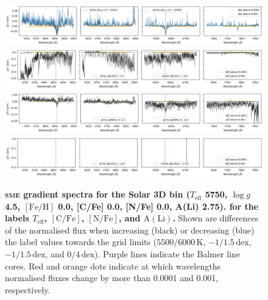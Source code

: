 \documentclass[
  journal=pasa,
  manuscript=research-paper, %
  year=2023,
  volume=37
]{cup-journal}
\newcommand{\Teff}{$T_\mathrm{eff}$\xspace}
\newcommand{\logg}{$\log g$\xspace}
\newcommand{\feh}{$\mathrm{[Fe/H]}$\xspace}
\newcommand{\vmic}{$v_\mathrm{mic}$\xspace}
\newcommand{\sme}{\textsc{sme}\xspace}
\newcommand{\dex}{\,\mathrm{dex}}	%
\newcommand{\K}{\,\mathrm{K}}	%
\begin{document}

\begin{figure}[ht]
 \centering
 \includegraphics[width=\textwidth]{figures/gradient_spectrum_5750_4.50_0.00_teff.png}
 \includegraphics[width=\textwidth]{figures/gradient_spectrum_5750_4.50_0.00_c_fe.png}
 \includegraphics[width=\textwidth]{figures/gradient_spectrum_5750_4.50_0.00_n_fe.png}
 \includegraphics[width=\textwidth]{figures/gradient_spectrum_5750_4.50_0.00_li_fe.png} \caption{\textbf{\sme gradient spectra for the Solar 3D bin (\Teff 5750, \logg 4.5, \feh 0.0, [C/Fe] 0.0, [N/Fe] 0.0, A(Li) 2.75). for the labels \Teff, $\mathrm{[C/Fe]}$, $\mathrm{[N/Fe]}$, and $\mathrm{A(Li)}$.} Shown are differences of the normalised flux when increasing (black) or decreasing (blue) the label values towards the grid limits ($5500/6000\K$, $-1/1.5\dex$, $-1/1.5\dex$, and $0/4\dex$). Purple lines indicate the Balmer line cores. Red and orange dots indicate at which wavelengths normalised fluxes change by more than 0.0001 and 0.001, respectively.
} \label{fig:gradient_spectrum_5750_4.50_0.00}
\end{figure}
\end{document}
